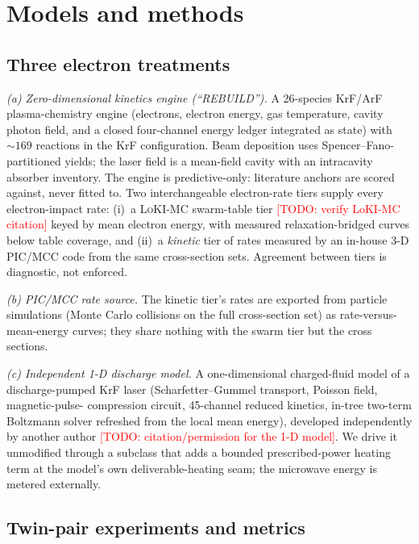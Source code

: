 \documentclass[aps,pra,preprint,longbibliography,nofootinbib]{revtex4-2}
\newcommand{\todo}[1]{\textcolor{red}{[TODO: #1]}}
\begin{document}
\section{Models and methods}

\subsection{Three electron treatments}

\emph{(a) Zero-dimensional kinetics engine (``REBUILD'').} A 26-species
KrF/ArF plasma-chemistry engine (electrons, electron energy, gas
temperature, cavity photon field, and a closed four-channel energy
ledger integrated as state) with ${\sim}169$ reactions in the KrF
configuration. Beam deposition uses Spencer--Fano-partitioned yields;
the laser field is a mean-field cavity with an intracavity absorber
inventory. The engine is predictive-only: literature anchors are scored
against, never fitted to. Two interchangeable electron-rate tiers
supply every electron-impact rate: (i)~a \textsc{LoKI-MC} swarm-table
tier \cite{loki}\todo{verify LoKI-MC citation} keyed by mean electron
energy, with measured relaxation-bridged curves below table coverage,
and (ii)~a \emph{kinetic} tier of rates measured by an in-house 3-D
PIC/MCC code from the same cross-section sets. Agreement between tiers
is diagnostic, not enforced.

\emph{(b) PIC/MCC rate source.} The kinetic tier's rates are exported
from particle simulations (Monte Carlo collisions on the full
cross-section set) as rate-versus-mean-energy curves; they share
nothing with the swarm tier but the cross sections.

\emph{(c) Independent 1-D discharge model.} A one-dimensional
charged-fluid model of a discharge-pumped KrF laser
(Scharfetter--Gummel transport, Poisson field, magnetic-pulse-
compression circuit, 45-channel reduced kinetics, in-tree two-term
Boltzmann solver refreshed from the local mean energy), developed
independently by another author \cite{oned}\todo{citation/permission
for the 1-D model}. We drive it unmodified through a subclass that adds
a bounded prescribed-power heating term at the model's own
deliverable-heating seam; the microwave energy is metered externally.

\subsection{Twin-pair experiments and metrics}
\end{document}
